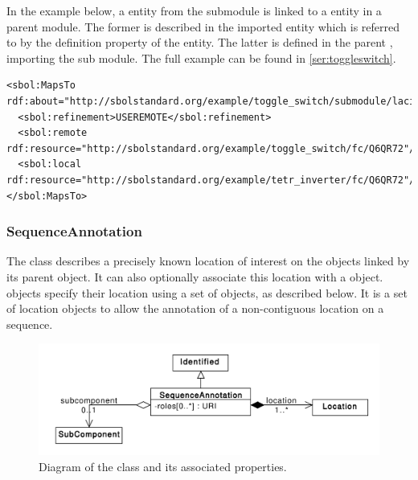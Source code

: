 In the example below, a  entity from the submodule is linked to a  entity in a parent module. The former is described in the imported  entity which is referred to by the definition property of the  entity. The latter is defined in the parent , importing the sub module. The full example can be found in \ref{ser:toggleswitch}.
\begin{lstlisting}
<sbol:MapsTo rdf:about="http://sbolstandard.org/example/toggle_switch/submodule/laci_inverter/mapping/Q6QR72">
  <sbol:refinement>USEREMOTE</sbol:refinement>
  <sbol:remote rdf:resource="http://sbolstandard.org/example/toggle_switch/fc/Q6QR72"/>
  <sbol:local rdf:resource="http://sbolstandard.org/example/tetr_inverter/fc/Q6QR72"/>
</sbol:MapsTo>
\end{lstlisting}


\subsubsection{SequenceAnnotation}
\label{sec:SequenceAnnotation}
The  class describes a precisely known location of interest on the  objects linked by its parent  object.  It can also optionally associate this location with a  object.  objects specify their location using a set of   objects, as described below.  It is a set of location objects to allow the annotation of a non-contiguous location on a sequence.


\begin{figure}[ht]
\begin{center}
\includegraphics[scale=0.6]{uml/sequence_annotation}
\caption[]{Diagram of the  class and its associated properties.}
\label{uml:sequence_annotation}
\end{center}
\end{figure}

